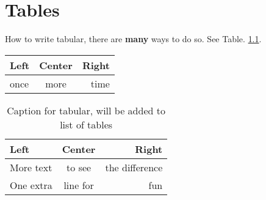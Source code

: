 \chapter{Tables}

How to write tabular, there are \textbf{many} ways to do so. See Table. \ref{tab:Tabletest}.

\begin{tabular}{l|c|r}
     Left & Center & Right \\ \hline
     once & more & time
\end{tabular}

\begin{table}[h]
    \centering
    \begin{tabular}{l|c|r} 
     Left & Center & Right \\ \hline
     More text & to see & the difference\\ 
     One extra & line for & fun
\end{tabular}
    \caption{Caption for tabular, will be added to list of tables}
    \label{tab:Tabletest}
\end{table}

